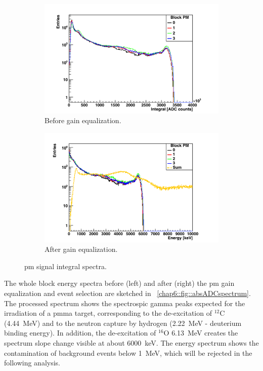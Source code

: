 \begin{figure}
\begin{subfigure}[t]{0.5\textwidth}
\centering
\includegraphics[width=1\textwidth]{03_GraphicFiles/chapter6_BeamTests/Nice_September2018/287_noSel/raw_PMhistos.png}
\caption{Before gain equalization.}
\label{chap6::fig::absPM_rawProfiles}
\end{subfigure}
\begin{subfigure}[t]{0.5\textwidth}
\centering
\includegraphics[width=1\textwidth]{03_GraphicFiles/chapter6_BeamTests/Nice_September2018/287_noSel/2_PM_canvas.png}
\caption{After gain equalization.}
\label{chap6::fig::absPM_calProfiles}
\end{subfigure}
\caption{\gls{pm} signal integral spectra.}
\label{chap6::fig::absPM_amp}
\end{figure}

The whole block energy spectra before (left) and after (right) the \gls{pm} gain equalization and event selection are sketched in \figurename~\ref{chap6::fig::absADCspectrum}. The processed spectrum shows the spectrospic gamma peaks expected for the irradiation of a \gls{pmma} target, corresponding to the de-excitation of $^{12}$C (4.44~MeV) and to the neutron capture by hydrogen (2.22~MeV - deuterium binding energy). In addition, the de-excitation of $^{16}$O {6.13~MeV} creates the spectrum slope change visible at about 6000~keV. The energy spectrum shows the contamination of background events below 1~MeV, which will be rejected in the following analysis.

